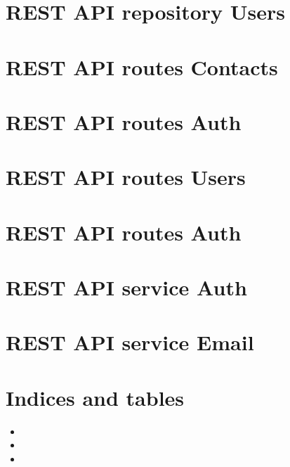 \documentclass[letterpaper,10pt,english]{sphinxmanual}
\begin{document}
\chapter{REST API repository Users}
\label{\detokenize{index:rest-api-repository-users}}

\chapter{REST API routes Contacts}
\label{\detokenize{index:rest-api-routes-contacts}}

\chapter{REST API routes Auth}
\label{\detokenize{index:rest-api-routes-auth}}

\chapter{REST API routes Users}
\label{\detokenize{index:rest-api-routes-users}}

\chapter{REST API routes Auth}
\label{\detokenize{index:id1}}

\chapter{REST API service Auth}
\label{\detokenize{index:rest-api-service-auth}}

\chapter{REST API service Email}
\label{\detokenize{index:rest-api-service-email}}

\chapter{Indices and tables}
\label{\detokenize{index:indices-and-tables}}\begin{itemize}
\item {} 
\sphinxAtStartPar
{}

\item {} 
\sphinxAtStartPar
{}

\item {} 
\sphinxAtStartPar
{}

\end{itemize}


\renewcommand{\indexname}{Python Module Index}
\begin{sphinxtheindex}
\let\bigletter\sphinxstyleindexlettergroup
\bigletter{s}
\item\relax{}
\end{sphinxtheindex}

\renewcommand{\indexname}{Index}
\printindex
\end{document}
